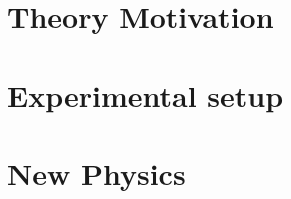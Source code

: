 \documentclass[a4paper,11pt,oneside]{memoir}
\begin{document}
\makeatletter
\renewcommand{\counterwithin}{\@ifstar{\@csinstar}{\@csin}}
\makeatother



\pagestyle{custom}%

\begingroup
    \frontmatter
    \clearpage
    \clearpage %
    \clearpage %
    \clearpage %
    \clearpage %
\endgroup



\begingroup
    \newpage
    
\endgroup




\mainmatter
{}









\part{Theory Motivation}


\FloatBarrier

\part{Experimental setup}




\FloatBarrier


\FloatBarrier
\part{New Physics}








\end{document}
